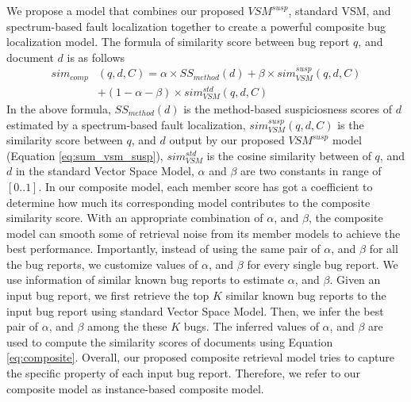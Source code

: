 We propose a model that combines our proposed $VSM^{susp}$, standard VSM, and spectrum-based fault localization together to create a powerful composite bug localization model.  The formula of similarity score between bug report $q$, and document $d$ is as follows
\begin{align}
sim_{comp}&(q,d,C)=\alpha \times SS_{method}(d)+\beta \times sim_{VSM}^{susp}(q,d,C) \nonumber\\
&+ (1-\alpha-\beta) \times sim_{VSM}^{std}(q,d,C)
\label{eq:composite}
\end{align}
In the above formula, $SS_{method}(d)$ is the method-based suspiciosness scores of $d$ estimated by a spectrum-based fault localization, $sim_{VSM}^{susp}(q,d,C)$ is the similarity score between $q$, and $d$ output by our proposed $VSM^{susp}$ model (Equation \ref{eq:sum_vsm_susp}), $sim_{VSM}^{std}$ is the cosine similarity between of $q$, and $d$ in the standard Vector Space Model, $\alpha$ and $\beta$ are two constants in range of $[0..1]$. In our composite model, each member score has got a coefficient to determine how much its corresponding model contributes to the composite similarity score. With an appropriate combination of $\alpha$, and $\beta$, the composite model can smooth some of retrieval noise from its member models to achieve the best performance. Importantly, instead of using the same pair of $\alpha$, and $\beta$ for all the bug reports, we customize values of $\alpha$, and $\beta$ for every single bug report. We use information of similar known bug reports to estimate $\alpha$, and $\beta$. Given an input bug report, we first retrieve the top $K$ similar known bug reports to the input bug report  using standard Vector Space Model. Then, we infer the best pair of $\alpha$, and $\beta$ among the these $K$ bugs. The inferred values of $\alpha$, and $\beta$ are used to compute the similarity scores of documents using Equation \ref{eq:composite}. Overall, our proposed composite retrieval model tries to capture the specific property of each input bug report. Therefore, we refer to our composite model as instance-based composite model.





